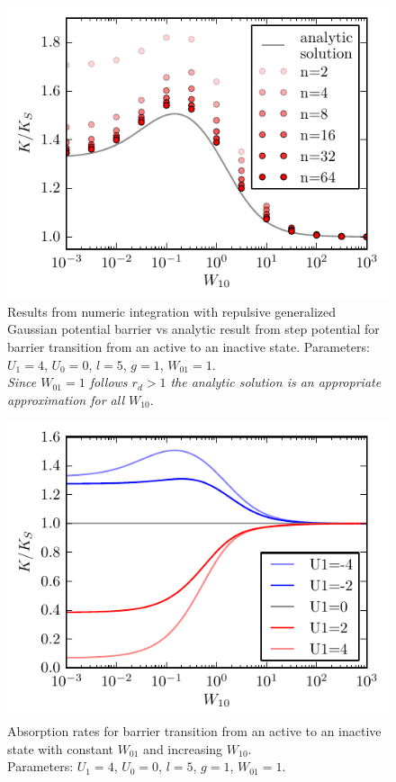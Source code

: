 \documentclass[twocolumn,superscriptaddress]{revtex4}
\begin{document}
\begin{figure}[H]
    \includegraphics[width= 0.5 \textwidth]{plots/conv_rates_for_barrier_transition.pdf}
    \caption{Results from numeric integration with repulsive generalized Gaussian potential barrier vs analytic result from step potential for barrier transition from an active to an inactive state. Parameters: $U_1 = 4$, $U_0=0$, $l=5$, $g=1$, $W_{01}=1$. \\ \emph{Since $W_{01}=1$ follows $r_d>1$ the analytic solution is an appropriate approximation for all $W_{10}$}.}
\end{figure}

\begin{figure}[H]
    \includegraphics[width= 0.5 \textwidth]{plots/rates_for_barrier_transition.pdf}
    \caption{Absorption rates for barrier transition from an active to an inactive state with constant $W_{01}$ and increasing $W_{10}$. \\ Parameters: $U_1 = 4$, $U_0=0$, $l=5$, $g=1$, $W_{01}=1$.}
\end{figure}
\end{document}
